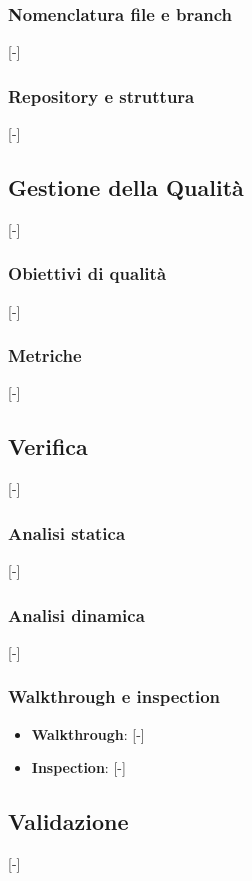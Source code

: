 \subsubsection{Nomenclatura file e branch}
[-]

\subsubsection{Repository e struttura}
[-]

\subsection{Gestione della Qualità}
[-]

\subsubsection{Obiettivi di qualità}
[-]

\subsubsection{Metriche}
[-]

\subsection{Verifica}
[-]

\subsubsection{Analisi statica}
[-]

\subsubsection{Analisi dinamica}
[-]

\subsubsection{Walkthrough e inspection}
\begin{itemize}
	\item \textbf{Walkthrough}: [-]
	\item \textbf{Inspection}: [-]
\end{itemize}

\subsection{Validazione}
[-]